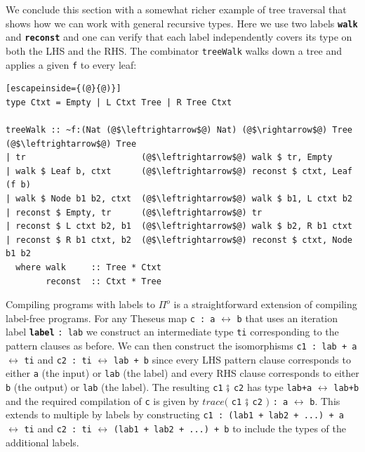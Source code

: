 \documentclass{article}
\newcommand{\kw}[1]{{\scriptsize{\textbf{\texttt{#1}}}}}
\newcommand{\ctr}[1]{{\scriptsize{\texttt{#1}}}}
\begin{document}
We conclude this section with a somewhat richer example of tree traversal
that shows how we can work with general recursive types. Here we use two
labels \kw{walk} and \kw{reconst} and one can verify that each label
independently covers its type on both the LHS and the RHS. The combinator
\ctr{treeWalk} walks down a tree and applies a given \ctr{f} to every leaf:

\begin{lstlisting}[escapeinside={(@}{@)}]
type Ctxt = Empty | L Ctxt Tree | R Tree Ctxt

treeWalk :: ~f:(Nat (@$\leftrightarrow$@) Nat) (@$\rightarrow$@) Tree (@$\leftrightarrow$@) Tree
| tr                       (@$\leftrightarrow$@) walk $ tr, Empty
| walk $ Leaf b, ctxt      (@$\leftrightarrow$@) reconst $ ctxt, Leaf (f b)
| walk $ Node b1 b2, ctxt  (@$\leftrightarrow$@) walk $ b1, L ctxt b2
| reconst $ Empty, tr      (@$\leftrightarrow$@) tr
| reconst $ L ctxt b2, b1  (@$\leftrightarrow$@) walk $ b2, R b1 ctxt
| reconst $ R b1 ctxt, b2  (@$\leftrightarrow$@) reconst $ ctxt, Node b1 b2
  where walk     :: Tree * Ctxt
        reconst  :: Ctxt * Tree
 \end{lstlisting}

\noindent
Compiling programs with labels to \ensuremath{\Pi^{o}} is a straightforward extension of
compiling label-free programs. For any Theseus map \ctr{c : a}
$\leftrightarrow$ \ctr{b} that uses an iteration label \kw{label} \ctr{: lab}
we construct an intermediate type \ctr{ti} corresponding to the pattern
clauses as before. We can then construct the isomorphisms \ctr{c1 : lab + a}
$\leftrightarrow$ \ctr{ti} and \ctr{c2 : ti} $\leftrightarrow$ \ctr{lab + b}
since every LHS pattern clause corresponds to either \ctr{a} (the input) or
\ctr{lab} (the label) and every RHS clause corresponds to either \ctr{b} (the
output) or \ctr{lab} (the label). The resulting \ctr{c1} $\fatsemi$ \ctr{c2}
has type \lstinline{lab+a} $\leftrightarrow$ \lstinline{lab+b} and the
required compilation of \ctr{c} is given by \ensuremath{\mathit{trace}(} \ctr{c1} $\fatsemi$
\ctr{c2} \ensuremath{)} \ctr{: a} $\leftrightarrow$ \ctr{b}. This extends to multiple
by labels by constructing \lstinline{c1 : (lab1 + lab2 + ...) + a}
$\leftrightarrow$ \ctr{ti} and \lstinline{c2 : ti} $\leftrightarrow$
\lstinline{(lab1 + lab2 + ...) + b} to include the types of the additional
labels.
\end{document}
